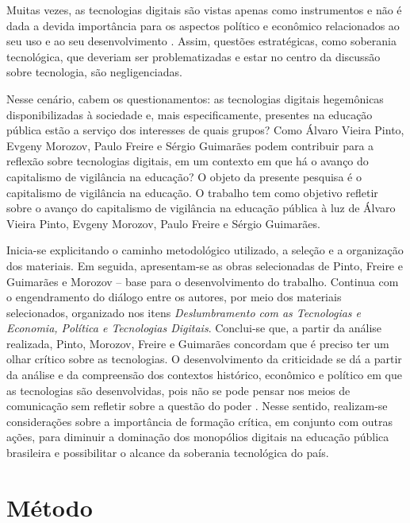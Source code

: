 \documentclass[portuguese]{textolivre}
\begin{document}
Muitas vezes, as tecnologias digitais são vistas apenas como instrumentos e não é dada a devida importância para os aspectos político e econômico relacionados ao seu uso e ao seu desenvolvimento \cite{pinto_o_2005, freire_educar_2011, morozov2018, cruz_neoliberalismo_2020}. Assim, questões estratégicas, como soberania tecnológica, que deveriam ser problematizadas e estar no centro da discussão sobre tecnologia, são negligenciadas.

Nesse cenário, cabem os questionamentos: as tecnologias digitais hegemônicas disponibilizadas à sociedade e, mais especificamente, presentes na educação pública estão a serviço dos interesses de quais grupos? Como Álvaro Vieira Pinto, Evgeny Morozov, Paulo Freire e Sérgio Guimarães podem contribuir para a reflexão sobre tecnologias digitais, em um contexto em que há o avanço do capitalismo de vigilância na educação? O objeto da presente pesquisa é o capitalismo de vigilância na educação. O trabalho tem como objetivo refletir sobre o avanço do capitalismo de vigilância na educação pública à luz de Álvaro Vieira Pinto, Evgeny Morozov, Paulo Freire e Sérgio Guimarães.

Inicia-se explicitando o caminho metodológico utilizado, a seleção e a organização dos materiais. Em seguida, apresentam-se as obras selecionadas de Pinto, Freire e Guimarães e Morozov – base para o desenvolvimento do trabalho. Continua com o engendramento do diálogo entre os autores, por meio dos materiais selecionados, organizado nos itens \emph{Deslumbramento com as Tecnologias e Economia, Política e Tecnologias Digitais}. Conclui-se que, a partir da análise realizada, Pinto, Morozov, Freire e Guimarães concordam que é preciso ter um olhar crítico sobre as tecnologias. O desenvolvimento da criticidade se dá a partir da análise e da compreensão dos contextos histórico, econômico e político em que as tecnologias são desenvolvidas, pois não se pode pensar nos meios de comunicação sem refletir sobre a questão do poder \cite{freire_educar_2011}. Nesse sentido, realizam-se considerações sobre a importância de formação crítica, em conjunto com outras ações, para diminuir a dominação dos monopólios digitais na educação pública brasileira e possibilitar o alcance da soberania tecnológica do país.




\section{Método}
\end{document}
